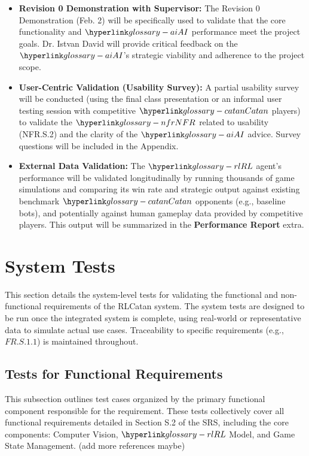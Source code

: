 \documentclass[12pt, titlepage]{article}
\begin{document}
\begin{itemize}
    \item \textbf{Revision 0 Demonstration with Supervisor:} The Revision 0 Demonstration (Feb. 2) will be specifically used to validate that the core functionality and $\AI{}$ performance meet the project goals. Dr. Istvan David will provide critical feedback on the $\AI{}$'s strategic viability and adherence to the project scope.
    \item \textbf{User-Centric Validation (Usability Survey):} A partial usability survey will be conducted (using the final class presentation or an informal user testing session with competitive $\Catan{}$ players) to validate the $\NFR{}$ related to usability (NFR.S.2) and the clarity of the $\AI{}$ advice. Survey questions will be included in the Appendix.
    \item \textbf{External Data Validation:} The $\RL{}$ agent's performance will be validated longitudinally by running thousands of game simulations and comparing its win rate and strategic output against existing benchmark $\Catan{}$ opponents (e.g., baseline bots), and potentially against human gameplay data provided by competitive players. This output will be summarized in the \textbf{Performance Report} extra.
\end{itemize}


\section{System Tests}


This section details the system-level tests for validating the functional and non-functional requirements of the RLCatan system.
The system tests are designed to be run once the integrated system is complete, using real-world or representative data to simulate actual use cases.
Traceability to specific requirements (e.g., $\hyperref[FR.S.1.1]{FR.S.1.1}$) is maintained throughout.



\subsection{Tests for Functional Requirements}


This subsection outlines test cases organized by the primary functional component responsible for the requirement.
These tests collectively cover all functional requirements detailed in Section S.2 of the SRS, including the core components: Computer Vision, $\RL{}$ Model, and Game State Management.
(add more references maybe)
\end{document}
